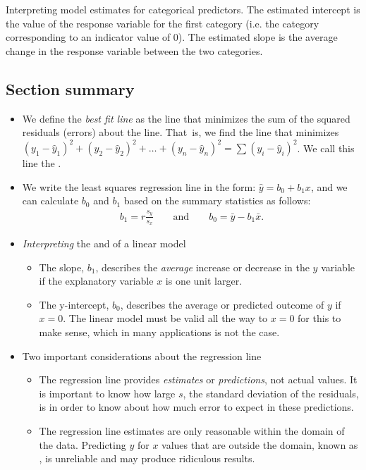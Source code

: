 \begin{onebox}{Interpreting model estimates for categorical predictors.}
The estimated intercept is the value of the response variable for the first category (i.e. the category corresponding to an indicator value of 0). The estimated slope is the average change in the response variable between the two categories.\end{onebox}


\D{\newpage}
 
\subsection*{Section summary}

\begin{itemize}
\item We define the \emph{best fit line} as the line that minimizes the sum of the squared residuals (errors) about the line.  That~is, we find the line that minimizes $(y_1 - \hat{y}_1)^2 + (y_2-\hat{y}_2)^2+ \dots + (y_n-\hat{y}_n)^2=\sum{(y_i - \hat{y}_i)^2}$. We call this line the .

\item We write the least squares regression line in the form: $\hat{y} = b_0 + b_1x$,  and we can calculate $b_0$ and $b_1$ based on the summary statistics as follows:
\begin{eqnarray*}
b_1=r\frac{s_y}{s_x} \qquad \text{and} \qquad b_0=\bar{y} - b_1\bar{x}.
\end{eqnarray*}

\item \emph{Interpreting} the  and  of a linear model
\begin{itemize}
\item The slope, $b_1$, describes the \emph{average} increase or decrease in the $y$ variable if the explanatory variable $x$ is one unit larger. 
\item The y-intercept, $b_0$, describes the average or predicted outcome of $y$ if $x=0$.  The linear model must be valid all the way to $x=0$ for this to make sense, which in many applications is not the case.
\end{itemize}

\item Two important considerations about the regression line
\begin{itemize}
\item  The regression line provides \textit{estimates} or \textit{predictions}, not actual values.  It is important to know how large $s$, the standard deviation of the residuals, is in order to know about how much error to expect in these predictions.
\item The regression line estimates are only reasonable within the domain of the data.  Predicting $y$ for $x$ values that are outside the domain, known as , is unreliable and may produce ridiculous results.
\end{itemize}


\end{itemize}
